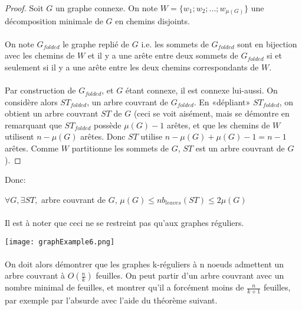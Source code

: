 \documentclass[a4paper]{article}
\theoremstyle{definition}
\theoremstyle{remark}
\begin{document}
\begin{proof}
Soit $G$ un graphe connexe. On note $W= \{ w_{1};w_{2};...;w_{\mu(G)} \}$ une décomposition minimale de $G$ en chemins disjoints.

\paragraph{}
On note $G_{folded}$ le graphe replié de $G$ i.e. les sommets de $G_{folded}$ sont en bijection avec les chemins de $W$ et il y a une arête entre deux sommets de $G_{folded}$ si et seulement si il y a une arête
entre les deux chemins correspondants de $W$.

\paragraph{}
Par construction de $G_{folded}$, et $G$ étant connexe, il est connexe 
lui-aussi. On considère alors $ST_{folded}$, un arbre couvrant de $G_{folded}$. En «dépliant» $ST_{folded}$, on obtient un arbre couvrant $ST$ de $G$ (ceci se voit aisément, mais se démontre en remarquant que $ST_{folded}$ possède $\mu(G)-1$ arêtes, et que les chemins de $W$ utilisent $n - \mu(G)$ arêtes. Donc $ST$ utilise $n - \mu(G) + \mu(G)-1 = n-1$ arêtes. Comme $W$ partitionne les sommets de $G$, $ST$ est un arbre couvrant de $G$).
\end{proof}

Donc:

$\forall G, \exists ST,$ arbre couvrant de $G$, $ \mu(G) \leq nb_{leaves}(ST) \leq 2\mu(G)$

\paragraph{}
Il est à noter que ceci ne se restreint pas qu'aux graphes réguliers.

\texttt{[image: graphExample6.png]}

\paragraph{}
On doit alors démontrer que les graphes k-réguliers à n noeuds admettent
un arbre couvrant à $O(\frac{n}{k})$ feuilles. On peut partir d'un arbre
couvrant avec un nombre minimal de feuilles, et montrer qu'il a forcément moins de $\frac{n}{k+1}$ feuilles, par exemple par l'absurde 
avec l'aide du théorème suivant.
\end{document}
